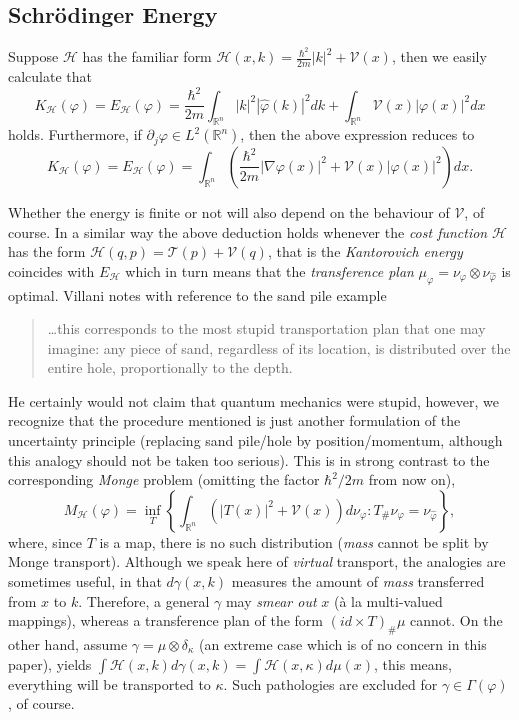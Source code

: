 \documentclass[12pt,a4paper]{article}
\newcommand{\RR}[1]{\mathbb{R}^#1}
\newcommand{\HH}{\mathcal{H}}
\newcommand{\VV}{\mathcal{V}}
\begin{document}
\subsection{Schrödinger Energy}
Suppose $\HH$ has the familiar form $\HH(x,k)= \frac{\hbar^2}{2m}|k|^2+\VV(x)$,
then we easily calculate that 
\begin{displaymath}
     K_\HH(\varphi) = E_\HH(\varphi)=
        \frac{\hbar^2}{2m} \int_{\RR n} |k|^2 |\hat\varphi(k)|^2  dk +   
        \int_{\RR n} \VV(x) |\varphi(x)|^2  dx
\end{displaymath}
holds. Furthermore, if $\partial_j\varphi\in L^2(\RR n)$,  
then the above expression reduces to 
\begin{equation}
          K_\HH(\varphi) = E_\HH(\varphi)= \int_{\RR n}
              \left(  \frac{\hbar^2}{2m} |\nabla\varphi(x)|^2
              + \VV(x) |\varphi(x)|^2 \right) dx.
\end{equation}

%
Whether the energy is finite or not will also depend on the behaviour of $\VV$, of
course. 
In a similar way the above deduction holds whenever the {\sl cost function} $\HH$
has the form $\HH(q,p)=\mathcal{T}(p)+\mathcal{V}(q)$, that is the 
{\sl Kantorovich energy} coincides with $E_\HH$ which in turn means that the 
{\sl transference plan} $\mu_\varphi=\nu_{\varphi}\otimes\nu_{\hat\varphi}$ 
is optimal. Villani notes with reference to the sand pile example \cite{villani_topics_2003} 
\begin{verse}
    \ldots this corresponds to the most stupid transportation plan that one may 
    imagine: any piece of sand, regardless of its location, is distributed
    over the entire hole, proportionally to the depth.
\end{verse} 
He certainly would not claim that quantum mechanics were stupid, however, we 
recognize that the procedure mentioned is just another formulation of the
uncertainty principle (replacing sand pile/hole by position/momentum, although this
analogy should not be taken too serious). This is in
strong contrast to the corresponding {\sl Monge} problem 
(omitting the factor $\hbar^2/2m$ from now on),
\begin{displaymath}
       M_\HH(\varphi)=\inf_{T} \left\{\int_{\RR n}
           \left( |T(x)|^2+\VV(x) \right) d\nu_{\varphi} : 
       T_\# \nu_{\varphi} = \nu_{\hat\varphi}\right\},
\end{displaymath}
where, since $T$ is a map, there is no such distribution ({\sl mass} 
cannot be split by Monge transport). Although we speak here of {\sl virtual}
transport, the analogies are sometimes useful, in that $d\gamma(x,k)$
measures the amount of {\sl mass} transferred from $x$ to $k$. Therefore,
a general $\gamma$ may {\sl smear out} $x$ (à la multi-valued mappings), whereas 
a transference plan of the form $(id\times T)_\#\mu$ cannot. On the other hand,
assume $\gamma = \mu\otimes \delta_\kappa$ (an extreme case which is of no concern
in this paper), yields $\int \HH(x,k) d\gamma(x,k) = \int \HH(x,\kappa) d\mu(x)$,
this means, everything will be transported to $\kappa$. Such pathologies are
excluded for $\gamma\in\Gamma(\varphi)$, of course.
\end{document}
